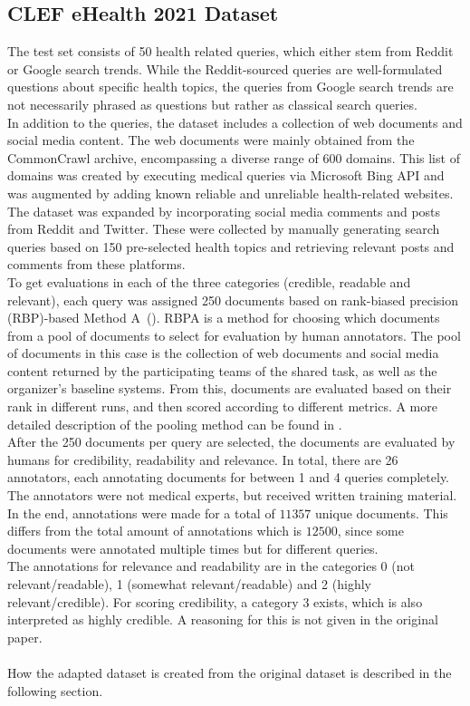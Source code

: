\subsection{CLEF eHealth 2021 Dataset}
The test set consists of 50 health related queries, which either stem from Reddit or Google search trends.
While the Reddit-sourced queries are well-formulated questions about specific health topics, the queries from Google search trends are not necessarily phrased as questions but rather as classical search queries.
\\
In addition to the queries, the dataset includes a collection of web documents and social media content.
The web documents were mainly obtained from the CommonCrawl archive, encompassing a diverse range of 600 domains.
This list of domains was created by executing medical queries via Microsoft Bing API and was augmented by adding known reliable and unreliable health-related websites.
The dataset was expanded by incorporating social media comments and posts from Reddit and Twitter.
These were collected by manually generating search queries based on 150 pre-selected health topics and retrieving relevant posts and comments from these platforms.
\\
To get evaluations in each of the three categories (credible, readable and relevant), each query was assigned 250 documents based on rank-biased precision (RBP)-based Method A~(\cite{moffat:2008}).
RBPA is a method for choosing which documents from a pool of documents to select for evaluation by human annotators.
The pool of documents in this case is the collection of web documents and social media content returned by the participating teams of the shared task, as well as the organizer's baseline systems.
From this, documents are evaluated based on their rank in different runs, and then scored according to different metrics.
A more detailed description of the pooling method can be found in \cite{lipani:2017}.
\\
After the 250 documents per query are selected, the documents are evaluated by humans for credibility, readability and relevance.
In total, there are 26 annotators, each annotating documents for between 1 and 4 queries completely.
The annotators were not medical experts, but received written training material.
In the end, annotations were made for  a total of $11 357$ unique documents.
This differs from the total amount of annotations which is $12 500$, since some documents were annotated multiple times but for different queries.
\\
The annotations for relevance and readability are in the categories 0 (not relevant/readable), 1 (somewhat relevant/readable) and 2 (highly relevant/credible).
For scoring credibility, a category 3 exists, which is also interpreted as highly credible.
A reasoning for this is not given in the original paper.
\\\\
How the adapted dataset is created from the original dataset is described in the following section.
